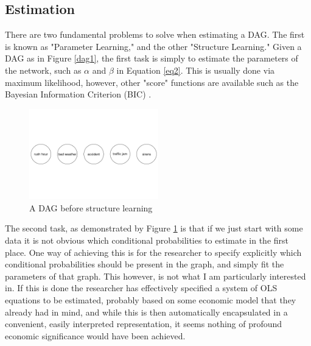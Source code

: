 \documentclass{article}
\begin{document}
\subsection{Estimation}

There are two fundamental problems to solve when estimating a DAG. The first is known as "Parameter Learning," and the other "Structure Learning." Given a DAG as in Figure \ref{dag1}, the first task is simply to estimate the parameters of the network, such as $\alpha$ and $\beta$ in Equation \ref{eq2}. This is usually done via maximum likelihood, however, other "score" functions are available such as the Bayesian Information Criterion (BIC) \cite{chen1998speaker}.

\begin{figure}
\centering
\label{dag2}
\includegraphics[width=0.5\textwidth]{images/trafficjam_unfit.png}
\caption{A DAG before structure learning}
\end{figure}

The second task, as demonstrated by Figure \ref{dag2} is that if we just start with some data it is not obvious which conditional probabilities to estimate in the first place. One way of achieving this is for the researcher to specify explicitly which conditional probabilities should be present in the graph, and simply fit the parameters of that graph. This however, is not what I am particularly interested in. If this is done the researcher has effectively specified a system of OLS equations to be estimated, probably based on some economic model that they already had in mind, and while this is then automatically encapsulated in a convenient, easily interpreted representation, it seems nothing of profound economic significance would have been achieved. 
\end{document}
